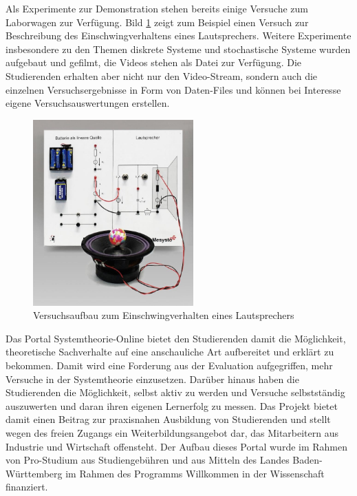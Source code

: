 \noindent Als Experimente zur Demonstration stehen bereits einige Versuche zum Laborwagen zur Verfügung. Bild \ref{fig:Lautsprecher} zeigt zum Beispiel einen Versuch zur Beschreibung des Einschwingverhaltens eines Lautsprechers. Weitere Experimente insbesondere zu den Themen diskrete Systeme und stochastische Systeme wurden aufgebaut und gefilmt, die Videos stehen als Datei zur Verfügung. Die Studierenden erhalten aber nicht nur den Video-Stream, sondern auch die einzelnen Versuchsergebnisse in Form von Daten-Files und können bei Interesse eigene Versuchsauswertungen erstellen. 
\clearpage

\begin{figure}[H]
  \centerline{\includegraphics[width=0.55\textwidth]{Einleitung/Bilder/image8.jpg}}
  \caption{Versuchsaufbau zum Einschwingverhalten eines Lautsprechers}
  \label{fig:Lautsprecher}
\end{figure}


\noindent Das Portal Systemtheorie-Online bietet den Studierenden damit die Möglichkeit, theoretische Sachverhalte auf eine anschauliche Art aufbereitet und erklärt zu bekommen. Damit wird eine Forderung aus der Evaluation aufgegriffen, mehr Versuche in der Systemtheorie einzusetzen. Darüber hinaus haben die Studierenden die Möglichkeit, selbst aktiv zu werden und Versuche selbstständig auszuwerten und daran ihren eigenen Lernerfolg zu messen. Das Projekt bietet damit einen Beitrag zur praxisnahen Ausbildung von Studierenden und stellt wegen des freien Zugangs ein Weiterbildungsangebot dar, das Mitarbeitern aus Industrie und Wirtschaft offensteht. Der Aufbau dieses Portal wurde im Rahmen von Pro-Studium aus Studiengebühren und aus Mitteln des Landes Baden-Württemberg im Rahmen des Programms Willkommen in der Wissenschaft finanziert.


